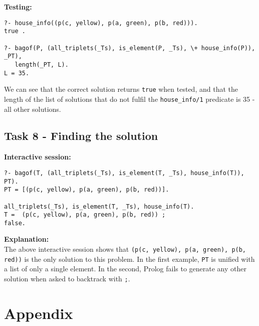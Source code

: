 \documentclass[11pt]{article}
\begin{document}
\textbf{Testing:}
\begin{verbatim}
?- house_info((p(c, yellow), p(a, green), p(b, red))).
true .

?- bagof(P, (all_triplets(_Ts), is_element(P, _Ts), \+ house_info(P)), _PT), 
   length(_PT, L).
L = 35.
\end{verbatim}

We can see that the correct solution returns {\verb|true|} when tested, and that the length of the list of solutions that do not fulfil the {\verb|house_info/1|} predicate is 35 - all other solutions.
\newpage

\subsection{Task 8 - Finding the solution}
\textbf{Interactive session:}
\begin{verbatim}
?- bagof(T, (all_triplets(_Ts), is_element(T, _Ts), house_info(T)), PT).
PT = [(p(c, yellow), p(a, green), p(b, red))].

all_triplets(_Ts), is_element(T, _Ts), house_info(T).
T =  (p(c, yellow), p(a, green), p(b, red)) ;
false.
\end{verbatim}

\textbf{Explanation:} \\
The above interactive session shows that {\verb|(p(c, yellow), p(a, green), p(b, red))|} is the only solution to this problem. In the first example, {\verb|PT|} is unified with a list of only a single element. In the second, Prolog fails to generate any other solution when asked to backtrack with {\verb|;|}. 
\newpage


\setlength{\headwidth}{\textwidth}

\section{Appendix}
\end{document}
